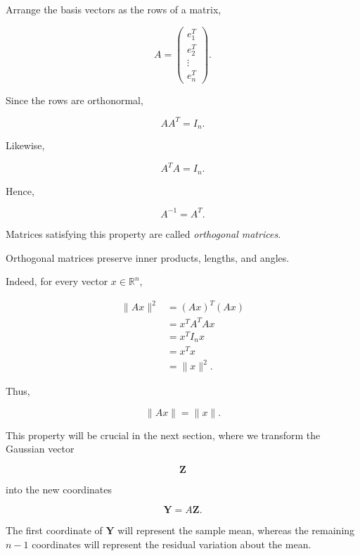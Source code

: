 \documentclass[11pt]{article}
\begin{document}
\begin{mdframed}[
		linewidth=0.8pt,
		roundcorner=6pt,
		backgroundcolor=gray!5,
		linecolor=gray!60,
		innertopmargin=10pt,
		innerbottommargin=10pt,
		innerleftmargin=10pt,
		innerrightmargin=10pt
		]
		Arrange the basis vectors as the rows of a matrix,
		
		\[
		A
		=
		\begin{pmatrix}
			e_1^T\\
			e_2^T\\
			\vdots\\
			e_n^T
		\end{pmatrix}.
		\]
		
		Since the rows are orthonormal,
		
		\[
		AA^T=I_n.
		\]
		
		Likewise,
		
		\[
		A^TA=I_n.
		\]
		
		Hence,
		
		\[
		\boxed{
			A^{-1}=A^T.
		}
		\]
		
		Matrices satisfying this property are called
		\emph{orthogonal matrices}.
		
		Orthogonal matrices preserve inner products, lengths, and angles.
		
		Indeed, for every vector $x\in\mathbb R^n$,
		
		\[
		\begin{aligned}
			\|Ax\|^2
			&=
			(Ax)^T(Ax)
			\\
			&=
			x^TA^TAx
			\\
			&=
			x^TI_nx
			\\
			&=
			x^Tx
			\\
			&=
			\|x\|^2.
		\end{aligned}
		\]
		
		Thus,
		
		\[
		\boxed{
			\|Ax\|=\|x\|.
		}
		\]
		
		This property will be crucial in the next section, where we transform the
		Gaussian vector
		
		\[
		\mathbf Z
		\]
		
		into the new coordinates
		
		\[
		\boxed{
			\mathbf Y=A\mathbf Z.
		}
		\]
		
		The first coordinate of $\mathbf Y$ will represent the sample mean,
		whereas the remaining $n-1$ coordinates will represent the residual
		variation about the mean.
		
	\end{mdframed}
	
\end{document}
